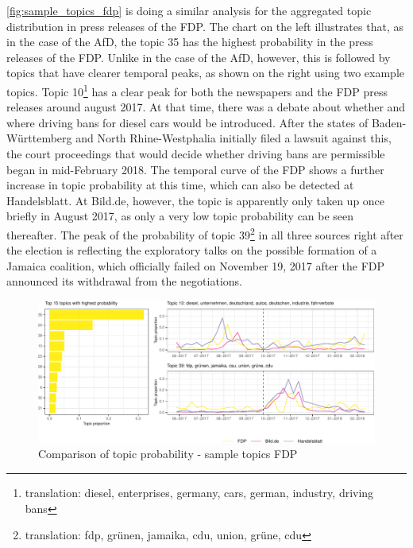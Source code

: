 \documentclass[
]{article}
\begin{document}
\autoref{fig:sample_topics_fdp} is doing a similar analysis for the
aggregated topic distribution in press releases of the FDP. The chart on
the left illustrates that, as in the case of the AfD, the topic 35 has
the highest probability in the press releases of the FDP. Unlike in the
case of the AfD, however, this is followed by topics that have clearer
temporal peaks, as shown on the right using two example topics. Topic
10\footnote{translation: diesel, enterprises, germany, cars, german,
  industry, driving bans} has a clear peak for both the newspapers and
the FDP press releases around august 2017. At that time, there was a
debate about whether and where driving bans for diesel cars would be
introduced. After the states of Baden-Württemberg and North
Rhine-Westphalia initially filed a lawsuit against this, the court
proceedings that would decide whether driving bans are permissible began
in mid-February 2018. The temporal curve of the FDP shows a further
increase in topic probability at this time, which can also be detected
at Handelsblatt. At Bild.de, however, the topic is apparently only taken
up once briefly in August 2017, as only a very low topic probability can
be seen thereafter. The peak of the probability of topic 39\footnote{translation:
  fdp, grünen, jamaika, cdu, union, grüne, cdu} in all three sources
right after the election is reflecting the exploratory talks on the
possible formation of a Jamaica coalition, which officially failed on
November 19, 2017 after the FDP announced its withdrawal from the
negotiations.

\begin{figure}

{\centering \includegraphics[width=1\linewidth]{main_text_files/figure-latex/Top FDP topics-1} 

}

\caption{Comparison of topic probability - sample topics FDP \label{fig:sample_topics_fdp}}\label{fig:Top FDP topics}
\end{figure}
\end{document}
